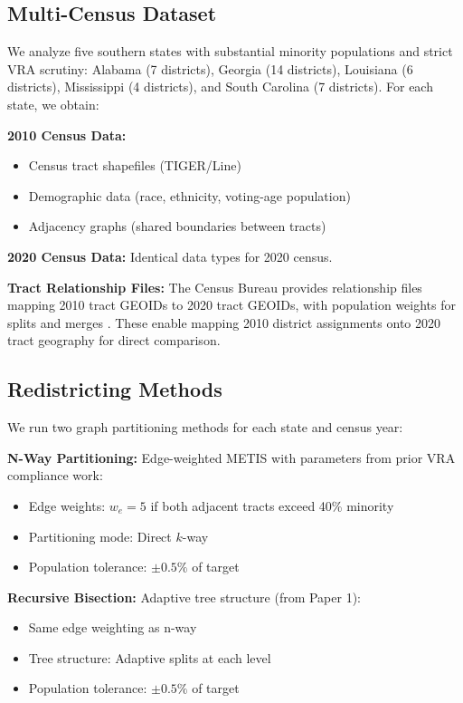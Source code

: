 \subsection{Multi-Census Dataset}

We analyze five southern states with substantial minority populations and strict VRA scrutiny: Alabama (7 districts), Georgia (14 districts), Louisiana (6 districts), Mississippi (4 districts), and South Carolina (7 districts). For each state, we obtain:

\textbf{2010 Census Data:}
\begin{itemize}
    \item Census tract shapefiles (TIGER/Line)
    \item Demographic data (race, ethnicity, voting-age population)
    \item Adjacency graphs (shared boundaries between tracts)
\end{itemize}

\textbf{2020 Census Data:} Identical data types for 2020 census.

\textbf{Tract Relationship Files:} The Census Bureau provides relationship files mapping 2010 tract GEOIDs to 2020 tract GEOIDs, with population weights for splits and merges \citep{census_tract_relationships}. These enable mapping 2010 district assignments onto 2020 tract geography for direct comparison.

\subsection{Redistricting Methods}

We run two graph partitioning methods for each state and census year:

\textbf{N-Way Partitioning:} Edge-weighted METIS with parameters from prior VRA compliance work:
\begin{itemize}
    \item Edge weights: $w_e = 5$ if both adjacent tracts exceed 40\% minority
    \item Partitioning mode: Direct $k$-way
    \item Population tolerance: $\pm 0.5\%$ of target
\end{itemize}

\textbf{Recursive Bisection:} Adaptive tree structure (from Paper 1):
\begin{itemize}
    \item Same edge weighting as n-way
    \item Tree structure: Adaptive splits at each level
    \item Population tolerance: $\pm 0.5\%$ of target
\end{itemize}

